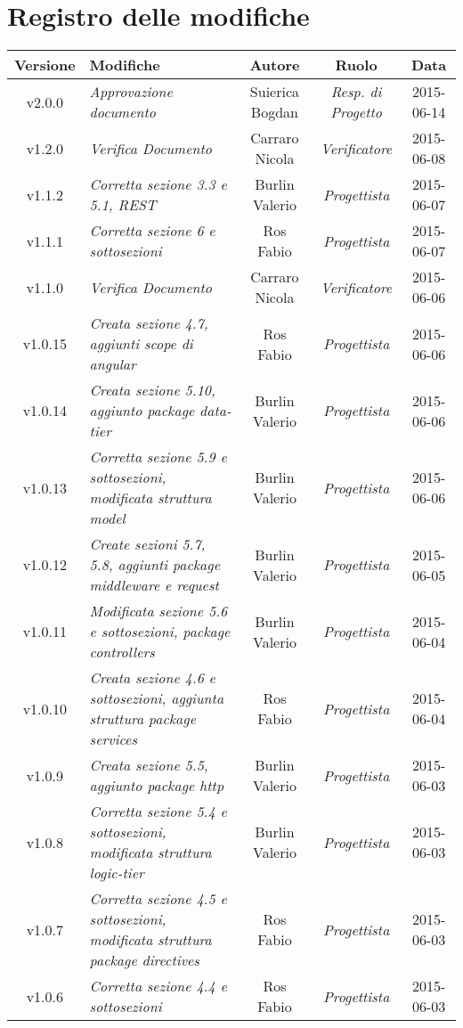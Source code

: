 \section*{Registro delle modifiche}

\begin{table}[h]
\centering
\begin{tabular}{|c|p{}|c|c|c|}
	\toprule
	\textbf{Versione} & \textbf{Modifiche} & \textbf{Autore} & \textbf{Ruolo} & \textbf{Data} \\
	\midrule
		v2.0.0 & \textit{Approvazione documento} & Suierica Bogdan & \textit{Resp. di Progetto} & 2015-06-14\\
	\midrule
		v1.2.0 & \textit{Verifica Documento} & Carraro Nicola & \textit{Verificatore} & 2015-06-08\\
	\midrule
		v1.1.2 & \textit{Corretta sezione 3.3 e 5.1, REST} & Burlin Valerio & \textit{Progettista} & 2015-06-07\\
	\midrule
		v1.1.1 & \textit{Corretta sezione 6 e sottosezioni} & Ros Fabio & \textit{Progettista} & 2015-06-07\\
	\midrule
		v1.1.0 & \textit{Verifica Documento} & Carraro Nicola & \textit{Verificatore} & 2015-06-06\\
	\midrule
		v1.0.15 & \textit{Creata sezione 4.7, aggiunti scope di angular} & Ros Fabio & \textit{Progettista} & 2015-06-06\\
	\midrule
		v1.0.14 & \textit{Creata sezione 5.10, aggiunto package data-tier} & Burlin Valerio & \textit{Progettista} & 2015-06-06\\
	\midrule
		v1.0.13 & \textit{Corretta sezione 5.9 e sottosezioni, modificata struttura model} & Burlin Valerio & \textit{Progettista} & 2015-06-06\\
	\midrule
		v1.0.12 & \textit{Create sezioni 5.7, 5.8, aggiunti package middleware e request} & Burlin Valerio & \textit{Progettista} & 2015-06-05\\
	\midrule
		v1.0.11 & \textit{Modificata sezione 5.6 e sottosezioni, package controllers} & Burlin Valerio & \textit{Progettista} & 2015-06-04\\
	\midrule
		v1.0.10 & \textit{Creata sezione 4.6 e sottosezioni, aggiunta struttura package services} & Ros Fabio & \textit{Progettista} & 2015-06-04\\
	\midrule
		v1.0.9 & \textit{Creata sezione 5.5, aggiunto package http} & Burlin Valerio & \textit{Progettista} & 2015-06-03\\
	\midrule
		v1.0.8 & \textit{Corretta sezione 5.4 e sottosezioni, modificata struttura logic-tier} & Burlin Valerio & \textit{Progettista} & 2015-06-03\\
	\midrule
		v1.0.7 & \textit{Corretta sezione 4.5 e sottosezioni, modificata struttura package directives} & Ros Fabio & \textit{Progettista} & 2015-06-03\\
	\midrule
		v1.0.6 & \textit{Corretta sezione 4.4 e sottosezioni} & Ros Fabio & \textit{Progettista} & 2015-06-03\\
	\bottomrule

\end{tabular}
\end{table}

